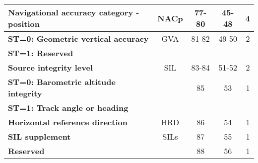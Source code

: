 \begin{table}[ht]
\begin{tabular}{|l|c|c|c|c|}
\textbf{Navigational accuracy category - position} & NACp & 77-80 & 45-48 & 4 \\ \hline
\textbf{ST=0: Geometric vertical accuracy} & GVA & 81-82 & 49-50 & 2\\
\textbf{ST=1: Reserved} &&&& \\ \hline
\textbf{Source integrity level} & SIL & 83-84 & 51-52 & 2 \\ \hline
\textbf{ST=0: Barometric altitude integrity} & & 85 & 53 & 1\\
\textbf{ST=1: Track angle or heading} &&&& \\ \hline
\textbf{Horizontal reference direction} & HRD & 86 & 54 & 1 \\ \hline
\textbf{SIL supplement} & SILs & 87 & 55 & 1 \\ \hline
\textbf{Reserved} &  & 88 & 56 & 1 \\ \hline
\end{tabular}
\end{table}
